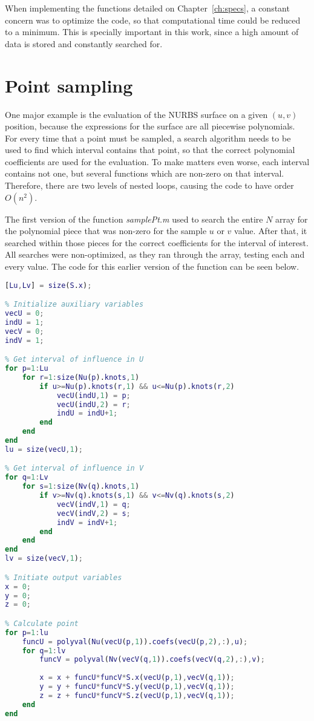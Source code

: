 	When implementing the functions detailed on Chapter~\ref{ch:specs}, a constant concern was to optimize the code, so that computational time could be reduced to a minimum. This is specially important in this work, since a high amount of data is stored and constantly searched for.
	
	\section{Point sampling}
	\label{sec:ptsampling}
	
	One major example is the evaluation of the NURBS surface on a given $(u,v)$ position, because the expressions for the surface are all piecewise polynomials. For every time that a point must be sampled, a search algorithm needs to be used to find which interval contains that point, so that the correct polynomial coefficients are used for the evaluation. To make matters even worse, each interval contains not one, but several functions which are non-zero on that interval. Therefore, there are two levels of nested loops, causing the code to have order $O(n^2)$.
	
	The first version of the function \textit{samplePt.m} used to search the entire $N$ array for the polynomial piece that was non-zero for the sample $u$ or $v$ value. After that, it searched within those pieces for the correct coefficients for the interval of interest. All searches were non-optimized, as they ran through the array, testing each and every value. The code for this earlier version of the function can be seen below.
	\newline
	
	\begin{lstlisting}[language=matlab]
% Number of functions for each direction
[Lu,Lv] = size(S.x);

% Initialize auxiliary variables
vecU = 0;
indU = 1;
vecV = 0;
indV = 1;

% Get interval of influence in U
for p=1:Lu
    for r=1:size(Nu(p).knots,1)
        if u>=Nu(p).knots(r,1) && u<=Nu(p).knots(r,2)
            vecU(indU,1) = p;
            vecU(indU,2) = r;
            indU = indU+1;
        end
    end
end
lu = size(vecU,1);

% Get interval of influence in V
for q=1:Lv
    for s=1:size(Nv(q).knots,1)
        if v>=Nv(q).knots(s,1) && v<=Nv(q).knots(s,2)
            vecV(indV,1) = q;
            vecV(indV,2) = s;
            indV = indV+1;
        end
    end
end 
lv = size(vecV,1);

% Initiate output variables
x = 0;
y = 0;
z = 0;

% Calculate point
for p=1:lu
    funcU = polyval(Nu(vecU(p,1)).coefs(vecU(p,2),:),u);
    for q=1:lv
        funcV = polyval(Nv(vecV(q,1)).coefs(vecV(q,2),:),v);
        
        x = x + funcU*funcV*S.x(vecU(p,1),vecV(q,1));
        y = y + funcU*funcV*S.y(vecU(p,1),vecV(q,1));
        z = z + funcU*funcV*S.z(vecU(p,1),vecV(q,1));
    end
end
	\end{lstlisting}
	
